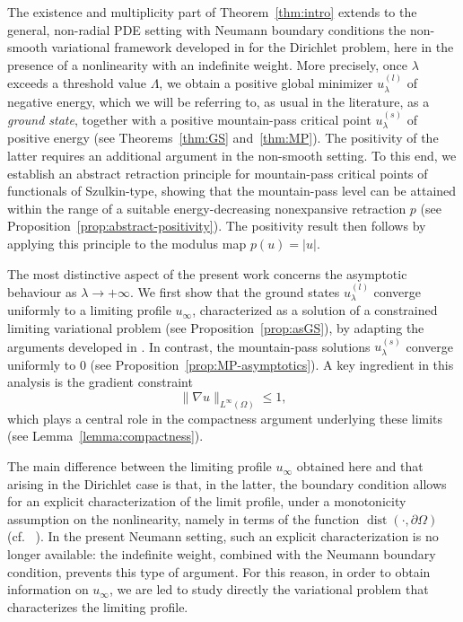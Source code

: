 \documentclass[11pt,reqno]{amsart}
\theoremstyle{plain}
\theoremstyle{definition}
\numberwithin{equation}{section}
\begin{document}
The existence and multiplicity part of Theorem~\ref{thm:intro} extends to the general, non-radial PDE setting with Neumann boundary conditions the non-smooth variational framework developed in \cite{BeJeMa14} for the Dirichlet problem, here in the presence of a nonlinearity with an indefinite weight. More precisely, once $\lambda$ exceeds a threshold value $\Lambda$, we obtain a positive global minimizer $u_\lambda^{(l)}$ of negative energy, which we will be referring to, as usual in the literature, as a \emph{ground state}, together with a positive mountain-pass critical point $u_\lambda^{(s)}$ of positive energy (see Theorems~\ref{thm:GS} and~\ref{thm:MP}). The positivity of the latter requires an additional argument in the non-smooth setting. To this end, we establish an abstract retraction principle for mountain-pass critical points of functionals of Szulkin-type, showing that the mountain-pass level can be attained within the range of a suitable energy-decreasing nonexpansive retraction $p$ (see Proposition~\ref{prop:abstract-positivity}). The positivity result then follows by applying this principle to the modulus map $p(u) = |u|$.

The most distinctive aspect of the present work concerns the asymptotic behaviour as $\lambda\to+\infty$. We first show that the ground states $u_\lambda^{(l)}$ converge uniformly to a limiting profile $u_\infty$, characterized as a solution of a constrained limiting variational problem (see Proposition~\ref{prop:asGS}), by adapting the arguments developed in \cite{BoCoZi26}. In contrast, the mountain-pass solutions $u_\lambda^{(s)}$ converge uniformly to $0$ (see Proposition~\ref{prop:MP-asymptotics}). A key ingredient in this analysis is the gradient constraint
$$
\|\nabla u\|_{L^\infty(\Omega)}\leq1,
$$
which plays a central role in the compactness argument underlying these limits (see Lemma~\ref{lemma:compactness}).

The main difference between the limiting profile $u_\infty$
obtained here and that arising in the Dirichlet case is that, in the latter,
the boundary condition allows for an explicit characterization of the limit
profile, under a monotonicity assumption on the nonlinearity, namely in terms
of the function $\operatorname{dist}(\cdot,\partial\Omega)$
(cf. ~\cite[Corollary 2.19]{BoCoZi26}). In the present Neumann setting, such an
explicit characterization is no longer available: the indefinite weight,
combined with the Neumann boundary condition, prevents this type of argument.
For this reason, in order to obtain information on $u_\infty$, we are led to
study directly the variational problem that characterizes the limiting
profile.
\end{document}
